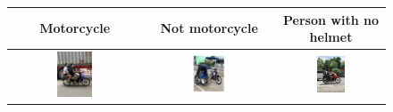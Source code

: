 \begin{refsection}
\begin{refsection}
\begin{figure}[H]
\centering
\begin{tabular}{|c|c|c|}
\hline
Motorcycle & Not motorcycle & Person with no helmet \\
\hline
\includegraphics[width=0.28\textwidth]{figures/Fig 7.png} & 
\includegraphics[width=0.28\textwidth]{figures/Fig 8.png} & 
\includegraphics[width=0.28\textwidth]{figures/Fig 9.png} \\
\hline
\end{tabular}

\vspace{0.3cm} %


\end{figure}
\end{refsection}
\end{refsection}
